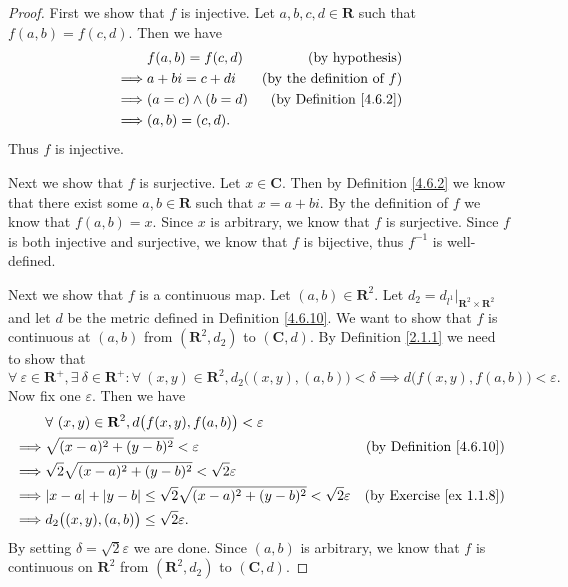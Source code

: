 \begin{proof}
    First we show that \(f\) is injective.
    Let \(a, b, c, d \in \mathbf{R}\) such that \(f(a, b) = f(c, d)\).
    Then we have
    \begin{align*}
                 & f(a, b) = f(c, d)     & \text{(by hypothesis)}              \\
        \implies & a + bi = c + di       & \text{(by the definition of \(f\))} \\
        \implies & (a = c) \land (b = d) & \text{(by Definition \ref{4.6.2})}  \\
        \implies & (a, b) = (c, d).
    \end{align*}
    Thus \(f\) is injective.

    Next we show that \(f\) is surjective.
    Let \(x \in \mathbf{C}\).
    Then by Definition \ref{4.6.2} we know that there exist some \(a, b \in \mathbf{R}\) such that \(x = a + bi\).
    By the definition of \(f\) we know that \(f(a, b) = x\).
    Since \(x\) is arbitrary, we know that \(f\) is surjective.
    Since \(f\) is both injective and surjective, we know that \(f\) is bijective, thus \(f^{-1}\) is well-defined.

    Next we show that \(f\) is a continuous map.
    Let \((a, b) \in \mathbf{R}^2\).
    Let \(d_2 = d_{l^1}|_{\mathbf{R}^2 \times \mathbf{R}^2}\) and let \(d\) be the metric defined in Definition \ref{4.6.10}.
    We want to show that \(f\) is continuous at \((a, b)\) from \((\mathbf{R}^2, d_2)\) to \((\mathbf{C}, d)\).
    By Definition \ref{2.1.1} we need to show that
    \[
        \forall\ \varepsilon \in \mathbf{R}^+, \exists\ \delta \in \mathbf{R}^+ : \forall\ (x, y) \in \mathbf{R}^2, d_2\big((x, y), (a, b)\big) < \delta \implies d\big(f(x, y), f(a, b)\big) < \varepsilon.
    \]
    Now fix one \(\varepsilon\).
    Then we have
    \begin{align*}
                 & \forall\ (x, y) \in \mathbf{R}^2, d\big(f(x, y), f(a, b)\big) < \varepsilon                                                         \\
        \implies & \sqrt{(x - a)^2 + (y - b)^2} < \varepsilon                                                    & \text{(by Definition \ref{4.6.10})} \\
        \implies & \sqrt{2} \sqrt{(x - a)^2 + (y - b)^2} < \sqrt{2} \varepsilon                                                                        \\
        \implies & \abs*{x - a} + \abs*{y - b} \leq \sqrt{2} \sqrt{(x - a)^2 + (y - b)^2} < \sqrt{2} \varepsilon & \text{(by Exercise \ref{ex 1.1.8})} \\
        \implies & d_2\big((x, y), (a, b)\big) \leq \sqrt{2} \varepsilon.
    \end{align*}
    By setting \(\delta = \sqrt{2} \varepsilon\) we are done.
    Since \((a, b)\) is arbitrary, we know that \(f\) is continuous on \(\mathbf{R}^2\) from \((\mathbf{R}^2, d_2)\) to \((\mathbf{C}, d)\).


\end{proof}
